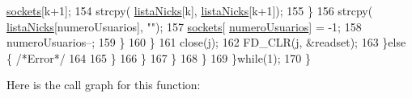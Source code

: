 \begin{DoxyCode}
      \hyperlink{_g-2361-06-_p1-_server_8c_a7724e53f22e431d1ecb6516951a172e1}{sockets}[k+1];
154                                                                         strcpy(
      \hyperlink{_g-2361-06-_p1-_server_8c_a713172366a6be2fbf8456a4b43702603}{listaNicks}[k], \hyperlink{_g-2361-06-_p1-_server_8c_a713172366a6be2fbf8456a4b43702603}{listaNicks}[k+1]);
155                                                                 \}
156                                                                 strcpy(
      \hyperlink{_g-2361-06-_p1-_server_8c_a713172366a6be2fbf8456a4b43702603}{listaNicks}[numeroUsuarios], \textcolor{stringliteral}{""});
157                                                                 \hyperlink{_g-2361-06-_p1-_server_8c_a7724e53f22e431d1ecb6516951a172e1}{sockets}[
      \hyperlink{_g-2361-06-_p1-_server_8c_ac9a5ec6f534d2a8e2a870179807d32dc}{numeroUsuarios}] = -1;
158                                                                 numeroUsuarios--;
159                                                         \}
160                                                 \}
161                                                 close(j);
162                                 FD\_CLR(j, &readset);
163                             \}\textcolor{keywordflow}{else} \{ \textcolor{comment}{/*Error*/}
164 
165                             \}
166                         \}      
167                 \}     
168                 \}
169         \}\textcolor{keywordflow}{while}(1);
170 \}
\end{DoxyCode}


Here is the call graph for this function\+:


